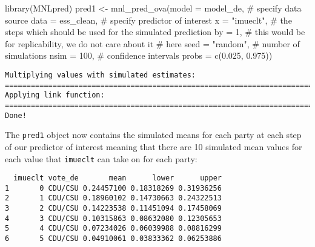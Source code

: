 \documentclass[
  letterpaper,
  DIV=11,
  numbers=noendperiod]{scrreprt}
\newenvironment{Shaded}{\begin{snugshade}}{\end{snugshade}}
\newcommand{\AttributeTok}[1]{\textcolor[rgb]{0.40,0.45,0.13}{#1}}
\newcommand{\CommentTok}[1]{\textcolor[rgb]{0.37,0.37,0.37}{#1}}
\newcommand{\DecValTok}[1]{\textcolor[rgb]{0.68,0.00,0.00}{#1}}
\newcommand{\FloatTok}[1]{\textcolor[rgb]{0.68,0.00,0.00}{#1}}
\newcommand{\FunctionTok}[1]{\textcolor[rgb]{0.28,0.35,0.67}{#1}}
\newcommand{\NormalTok}[1]{\textcolor[rgb]{0.00,0.23,0.31}{#1}}
\newcommand{\OtherTok}[1]{\textcolor[rgb]{0.00,0.23,0.31}{#1}}
\newcommand{\SpecialCharTok}[1]{\textcolor[rgb]{0.37,0.37,0.37}{#1}}
\newcommand{\StringTok}[1]{\textcolor[rgb]{0.13,0.47,0.30}{#1}}
\begin{document}
\begin{Shaded}
\begin{Highlighting}[]
\FunctionTok{library}\NormalTok{(MNLpred)}
\NormalTok{pred1 }\OtherTok{\textless{}{-}} \FunctionTok{mnl\_pred\_ova}\NormalTok{(}\AttributeTok{model =}\NormalTok{ model\_de,}
                      \CommentTok{\# specify data source}
                      \AttributeTok{data =}\NormalTok{ ess\_clean,}
                      \CommentTok{\# specify predictor of interest}
                      \AttributeTok{x =} \StringTok{"imueclt"}\NormalTok{,}
                      \CommentTok{\# the steps which should be used for the simulated prediction}
                      \AttributeTok{by =} \DecValTok{1}\NormalTok{,}
                      \CommentTok{\# this would be for replicability, we do not care about it}
                      \CommentTok{\# here }
                      \AttributeTok{seed =} \StringTok{"random"}\NormalTok{,}
                      \CommentTok{\# number of simulations}
                      \AttributeTok{nsim =} \DecValTok{100}\NormalTok{,}
                      \CommentTok{\# confidence intervals}
                      \AttributeTok{probs =} \FunctionTok{c}\NormalTok{(}\FloatTok{0.025}\NormalTok{, }\FloatTok{0.975}\NormalTok{))}
\end{Highlighting}
\end{Shaded}

\begin{verbatim}
Multiplying values with simulated estimates:
================================================================================
Applying link function:
================================================================================
Done!
\end{verbatim}

The \texttt{pred1} object now contains the simulated means for each
party at each step of our predictor of interest meaning that there are
10 simulated mean values for each value that \texttt{imueclt} can take
on for each party:

\begin{Shaded}
\end{Shaded}

\begin{verbatim}
  imueclt vote_de       mean      lower      upper
1       0 CDU/CSU 0.24457100 0.18318269 0.31936256
2       1 CDU/CSU 0.18960102 0.14730663 0.24322513
3       2 CDU/CSU 0.14223538 0.11451094 0.17458069
4       3 CDU/CSU 0.10315863 0.08632080 0.12305653
5       4 CDU/CSU 0.07234026 0.06039988 0.08816299
6       5 CDU/CSU 0.04910061 0.03833362 0.06253886
\end{verbatim}
\end{document}
